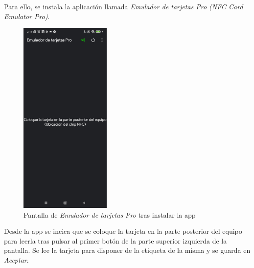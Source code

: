 \documentclass[12pt,a4paper,onecolumn,oneside]{report}
\begin{document}
Para ello, se instala la aplicación llamada \textit{Emulador de tarjetas Pro (NFC Card Emulator Pro)}. 


\begin{figure}[H] 
\centering
  \includegraphics[width=0.4\textwidth]{figuras/root6.png}
  \caption[Pantalla de \textit{Emulador de tarjetas Pro} tras instalar la app]{Pantalla de \textit{Emulador de tarjetas Pro} tras instalar la app\\
  }
  \label{fig:root6}
\end{figure}

Desde la app se incica que se coloque la tarjeta en la parte posterior del equipo para leerla tras pulsar al primer botón de la parte superior izquierda de la pantalla. Se lee la tarjeta para disponer de la etiqueta de la misma y se guarda en \textit{Aceptar}.
\end{document}
